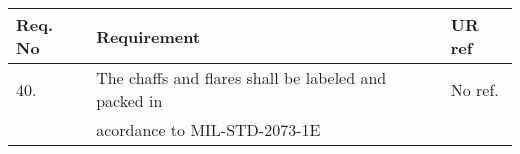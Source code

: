 \begin{center}
    \begin{tabular}{ | l | p{9cm} | l |}
    \hline
    Req. No & Requirement  & UR ref \\ \hline
    40. & The chaffs and flares shall be labeled and packed in& No ref.\\& acordance to MIL-STD-2073-1E & \\ \hline
    \end{tabular}
\end{center}
